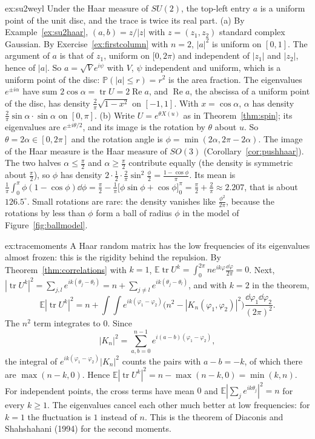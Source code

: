 \begin{solution}{ex:su2weyl}
\idea Under the Haar measure of $SU(2)$, the top-left entry $a$ is a uniform point of the unit disc, and the trace is twice its real part.
\writeup (a) By Example~\ref{ex:su2haar}, $(a,b)=z/|z|$ with $z=(z_1,z_2)$ standard complex Gaussian. By Exercise~\ref{ex:firstcolumn} with $n=2$, $|a|^2$ is uniform on $[0,1]$. The argument of $a$ is that of $z_1$,
uniform on $[0,2\pi)$ and independent of $|z_1|$ and $|z_2|$, hence of $|a|$. So $a=\sqrt V e^{i\psi}$ with $V$, $\psi$ independent and uniform, which is a uniform point of the disc: $\mathbb P(|a|\le r)=r^2$ is the area
fraction. The eigenvalues $e^{\pm i\alpha}$ have sum $2\cos\alpha=\operatorname{tr}U=2\operatorname{Re}a$, and $\operatorname{Re}a$, the abscissa of a uniform point of the disc, has density $\frac2\pi\sqrt{1-x^2}$ on $[-1,1]$.
With $x=\cos\alpha$, $\alpha$ has density $\frac2\pi\sin\alpha\cdot\sin\alpha$ on $[0,\pi]$.
(b) Write $U=e^{\theta X(u)}$ as in Theorem~\ref{thm:spin}; its eigenvalues are $e^{\pm i\theta/2}$, and its image is the rotation by $\theta$ about $u$. So $\theta=2\alpha\in[0,2\pi]$ and the rotation angle is
$\phi=\min(2\alpha,2\pi-2\alpha)$. The image of the Haar measure is the Haar measure of $SO(3)$ (Corollary~\ref{cor:pushhaar}). The two halves $\alpha\le\frac\pi2$ and $\alpha\ge\frac\pi2$ contribute equally (the density
is symmetric about $\frac\pi2$), so $\phi$ has density $2\cdot\frac12\cdot\frac2\pi\sin^2\frac\phi2=\frac{1-\cos\phi}\pi$. Its mean is $\frac1\pi\int_0^\pi\phi(1-\cos\phi)\dd\phi=\frac\pi2-\frac1\pi\bigl[\phi\sin\phi+\cos\phi\bigr]_0^\pi=\frac\pi2+\frac2\pi\approx2.207$, that is
about $126.5^\circ$. Small rotations are rare: the density vanishes like $\frac{\phi^2}{2\pi}$, because the rotations by less than $\phi$ form a ball of radius $\phi$ in the model of Figure~\ref{fig:ballmodel}.
\end{solution}

\begin{solution}{ex:tracemoments}
\idea A Haar random matrix has the low frequencies of its eigenvalues almost frozen: this is the rigidity behind the repulsion.
\writeup By Theorem~\ref{thm:correlations} with $k=1$, $\mathbb E\operatorname{tr}U^k=\int_0^{2\pi}ne^{ik\varphi}\frac{\dd\varphi}{2\pi}=0$. Next, $|\operatorname{tr}U^k|^2=\sum_{j,l}e^{ik(\theta_j-\theta_l)}=n+\sum_{j\neq l}e^{ik(\theta_j-\theta_l)}$, and with $k=2$ in the theorem,
\[\mathbb E|\operatorname{tr}U^k|^2=n+\int\!\!\int e^{ik(\varphi_1-\varphi_2)}\bigl(n^2-|K_n(\varphi_1,\varphi_2)|^2\bigr)\frac{\dd\varphi_1\dd\varphi_2}{(2\pi)^2}.\]
The $n^2$ term integrates to $0$. Since
\[|K_n|^2=\sum_{a,b=0}^{n-1}e^{i(a-b)(\varphi_1-\varphi_2)},\]
the integral of $e^{ik(\varphi_1-\varphi_2)}|K_n|^2$ counts the pairs with $a-b=-k$, of which there are $\max(n-k,0)$. Hence
$\mathbb E|\operatorname{tr}U^k|^2=n-\max(n-k,0)=\min(k,n)$. For independent points, the cross terms have mean $0$ and $\mathbb E|\sum_je^{ik\theta_j}|^2=n$ for every $k\ge1$. The eigenvalues cancel each other much
better at low frequencies: for $k=1$ the fluctuation is $1$ instead of $n$. This is the theorem of Diaconis and Shahshahani (1994) for the second moments.
\end{solution}

